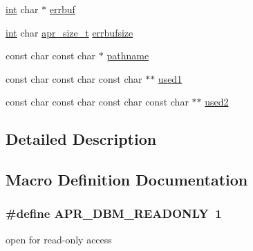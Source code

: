 \begin{DoxyCompactItemize}
\item 
\hyperlink{pcre_8txt_a42dfa4ff673c82d8efe7144098fbc198}{int} char $\ast$ \hyperlink{group__APR__Util__DBM_ga0685405e21ba98006ffc7459350e47b5}{errbuf}
\item 
\hyperlink{pcre_8txt_a42dfa4ff673c82d8efe7144098fbc198}{int} char \hyperlink{group__apr__platform_gaaa72b2253f6f3032cefea5712a27540e}{apr\+\_\+size\+\_\+t} \hyperlink{group__APR__Util__DBM_ga87b174ca67f400954b4696446a9a35e5}{errbufsize}
\item 
const char const char $\ast$ \hyperlink{group__APR__Util__DBM_gaf694cab4f4f6cd4b594af3c43cef1d0a}{pathname}
\item 
const char const char const char $\ast$$\ast$ \hyperlink{group__APR__Util__DBM_gae1e64da159a1d4114c6c5c4b2568cc66}{used1}
\item 
const char const char const char const char $\ast$$\ast$ \hyperlink{group__APR__Util__DBM_gad076b56c48879e14e0daddd60ff3eb8c}{used2}
\end{DoxyCompactItemize}


\subsection{Detailed Description}


\subsection{Macro Definition Documentation}
\subsubsection[{\texorpdfstring{A\+P\+R\+\_\+\+D\+B\+M\+\_\+\+R\+E\+A\+D\+O\+N\+LY}{APR_DBM_READONLY}}]{\setlength{\rightskip}{0pt plus 5cm}\#define A\+P\+R\+\_\+\+D\+B\+M\+\_\+\+R\+E\+A\+D\+O\+N\+LY~1}\hypertarget{group__APR__Util__DBM_gacd6e9c0783bd0c232bdd02b14655b6b1}{}\label{group__APR__Util__DBM_gacd6e9c0783bd0c232bdd02b14655b6b1}
open for read-\/only access 
